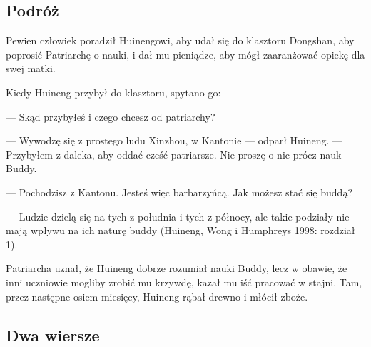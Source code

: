 \subsection{Podróż}
Pewien człowiek poradził Huinengowi, aby udał się do klasztoru Dongshan, aby poprosić Patriarchę o nauki, i dał mu pieniądze, aby mógł zaaranżować opiekę dla swej matki.

Kiedy Huineng przybył do klasztoru, spytano go:

--- Skąd przybyłeś i czego chcesz od patriarchy?

--- Wywodzę się z prostego ludu Xinzhou, w Kantonie --- odparł Huineng. --- Przybyłem z daleka, aby oddać cześć patriarsze. Nie proszę o nic prócz nauk Buddy.

--- Pochodzisz z Kantonu. Jesteś więc barbarzyńcą. Jak możesz stać się buddą?

--- Ludzie dzielą się na tych z południa i tych z północy, ale takie podziały nie mają wpływu na ich naturę buddy (Huineng, Wong i Humphreys 1998: rozdział 1).

Patriarcha uznał, że Huineng dobrze rozumiał nauki Buddy, lecz w obawie, że inni uczniowie mogliby zrobić mu krzywdę, kazał mu iść pracować w stajni. Tam, przez następne osiem miesięcy, Huineng rąbał drewno i młócił zboże.

\subsection{Dwa wiersze}

